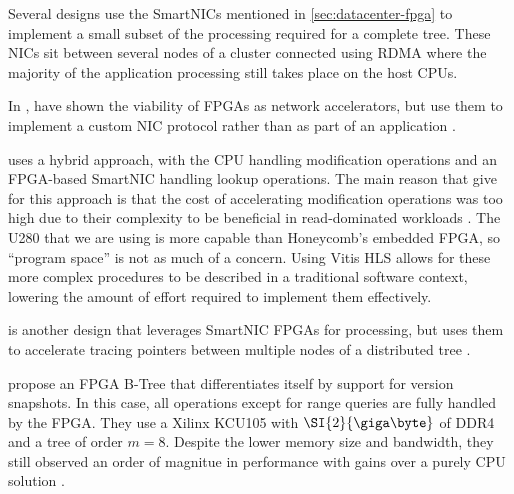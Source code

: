 

Several designs \autocite{honeycomb,strom,star} use the SmartNICs mentioned in
\ref{sec:datacenter-fpga} to implement a small subset of the processing required
for a complete tree. These NICs sit between several nodes of a cluster connected
using RDMA where the majority of the application processing still takes place on
the host CPUs.

In , \citeauthor{star} have shown the viability of FPGAs as
network accelerators, but use them to implement a custom NIC protocol rather
than as part of an application \autocite{star}.


 uses a hybrid approach, with the CPU handling modification
operations and an FPGA-based SmartNIC handling lookup operations. The main
reason that \citeauthor{honeycomb} give for this approach is that the cost of
accelerating modification operations was too high due to their complexity to be
beneficial in read-dominated workloads \autocite{honeycomb}. The U280 that we
are using is more capable than Honeycomb's embedded FPGA, so ``program space''
is not as much of a concern. Using Vitis HLS allows for these more complex
procedures to be described in a traditional software context, lowering the
amount of effort required to implement them effectively.

 is another design that leverages SmartNIC FPGAs for
processing, but uses them to accelerate tracing pointers between multiple nodes
of a distributed tree \autocite{strom}.

\citeauthor{ren-fpl-2019} propose an FPGA B-Tree that differentiates itself by
support for version snapshots. In this case, all operations except for range
queries are fully handled by the FPGA. They use a Xilinx KCU105 with
$\SI{2}{\giga\byte}$ of DDR4 and a tree of order $m=8$. Despite the lower memory
size and bandwidth, they still observed an order of magnitue in performance with
gains over a purely CPU solution \autocite{ren-fpl-2019}.
